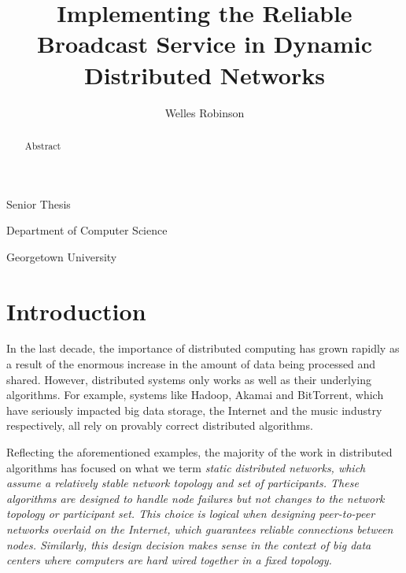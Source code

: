 \documentclass[english]{article}
\begin{document}
\title{Implementing the Reliable Broadcast Service in Dynamic Distributed Networks}

\maketitle
\begin{center}\author{Welles Robinson}\end{center}
\noindent \begin{center}Senior Thesis\par\end{center}
\noindent \begin{center}Department of Computer
Science\par\end{center}
\noindent \begin{center}Georgetown University\par\end{center}

\newtheorem{definition} {Definition}
\newcommand{\mydef}[1]{\begin{definition}#1\end{definition}}

\begin{abstract}
Abstract
\end{abstract}


\section{Introduction}

In the last decade, the importance of distributed computing has grown rapidly as a result of the enormous increase in the amount of data being processed and shared. However, distributed systems only works as well as their underlying algorithms. For example, systems like Hadoop, Akamai and BitTorrent, which have seriously impacted big data storage, the Internet and the music industry respectively, all rely on provably correct distributed algorithms. 

Reflecting the aforementioned examples, the majority of the work in distributed algorithms has focused on what we term \em static distributed networks\em, which assume a relatively stable network topology and set of participants. These algorithms are designed to handle node failures but not changes to the network topology or participant set. This choice is logical when designing peer-to-peer networks overlaid on the Internet, which guarantees reliable connections between nodes. Similarly, this design decision makes sense in the context of big data centers where computers are hard wired together in a fixed topology. 
\end{document}
